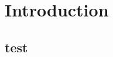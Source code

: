 \documentclass[12pt,a4paper]{report}
\begin{document}
 

\section{Introduction}
\label{sec:intro} 
\subsection{test}
\cite{intelmath}



\end{document}
